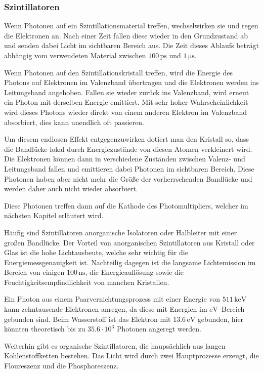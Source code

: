 \documentclass[12pt,a4paper]{scrartcl}
\numberwithin{equation}{section} %
\newcommand{\pu}[1]{\ensuremath{\mathrm{#1}}}
\begin{document}
\hypertarget{szintillatoren}{%
\subsubsection{Szintillatoren}\label{szintillatoren}}
Wenn Photonen auf ein Szintillationsmaterial treffen, wechselwirken sie und regen die Elektronen an. Nach einer Zeit fallen diese wieder in den Grundzustand ab und senden dabei Licht im sichtbaren Bereich aus. Die Zeit dieses Ablaufs beträgt abhängig vom verwendeten Material zwischen $\pu{100\, ps}$ und $\pu{1\,\mu s}$.

Wenn Photonen auf den Szintillationskristall treffen, wird die Energie des Photons auf Elektronen im Valenzband übertragen und die Elektronen werden ins Leitungsband angehoben. Fallen sie wieder zurück ins Valenzband, wird erneut ein Photon mit derselben Energie emittiert. Mit sehr hoher Wahrscheinlichkeit wird dieses Photons wieder direkt von einem anderen Elektron im Valenzband absorbiert, dies kann unendlich oft passieren.

Um diesem endlosen Effekt entgegenzuwirken dotiert man den Kristall so, dass die Bandlücke lokal durch Energiezustände von diesen Atomen verkleinert wird. Die Elektronen können dann in verschiedene Zuständen zwischen Valenz- und Leitungsband fallen und emittieren dabei Photonen im sichtbaren Bereich. Diese Photonen haben aber nicht mehr die Größe der vorherrschenden Bandlücke und werden daher auch nicht wieder absorbiert.

Diese Photonen treffen dann auf die Kathode des Photomultipliers, welcher im nächsten Kapitel erläutert wird.

Häufig sind Szintillatoren anorganische Isolatoren oder Halbleiter mit einer großen Bandlücke. Der Vorteil von anorganischen Szintillatoren aus Kristall oder Glas ist die hohe Lichtausbeute, welche sehr wichtig für die Energiemessgenauigkeit ist. Nachteilig dagegen ist die langsame Lichtemission im Bereich von einigen $\pu{100\, ns}$, die Energieauflösung sowie die Feuchtigkeitsempfindlichkeit von manchen Kristallen.

Ein Photon aus einem Paarvernichtungsprozess mit einer Energie von $\pu{511\,keV}$ kann zehntausende Elektronen anregen, da diese mit Energien im $\pu{eV}$--Bereich gebunden sind. Beim Wasserstoff ist das Elektron mit $\pu{13.6\,eV}$ gebunden, hier könnten theoretisch bis zu $35.6\cdot 10^3$ Photonen angeregt werden.

Weiterhin gibt es organische Szintillatoren, die haupsächlich aus langen Kohlenstoffketten bestehen. Das Licht wird durch zwei Hauptprozesse erzeugt, die Floureszenz und die Phosphoreszenz. \cite{LMU}
\end{document}
